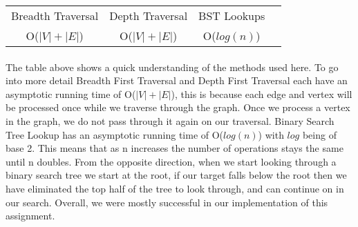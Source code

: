 \documentclass[letterpaper, 10pt,DIV=13]{scrartcl}
\numberwithin{equation}{section} %
\numberwithin{figure}{section} %
\numberwithin{table}{section} %
\begin{document}
\begin{center}
\begin{tabular}{ |c|c|c|c| } 
 \hline
 Breadth Traversal & Depth Traversal & BST Lookups\\ 
 O($|V|+|E|$) & O($|V|+|E|$) & O($log(n)$)\\ 
 \hline
\end{tabular}
\end{center}

\paragraph{} The table above shows a quick understanding of the methods used here. To go into more detail Breadth First Traversal and Depth First Traversal each have an asymptotic running time of  O($|V|+|E|$), this is because each edge and vertex will be processed once while we traverse through the graph. Once we process a vertex in the graph, we do not pass through it again on our traversal. Binary Search Tree Lookup has an asymptotic running time of O($log(n)$) with $log$ being of base 2. This means that as n increases the number of operations stays the same until n doubles. From the opposite direction, when we start looking through a binary search tree we start at the root, if our target falls below the root then we have eliminated the top half of the tree to look through, and can continue on in our search. Overall, we were mostly successful in our implementation of this assignment.

 

\pagebreak
\end{document}
